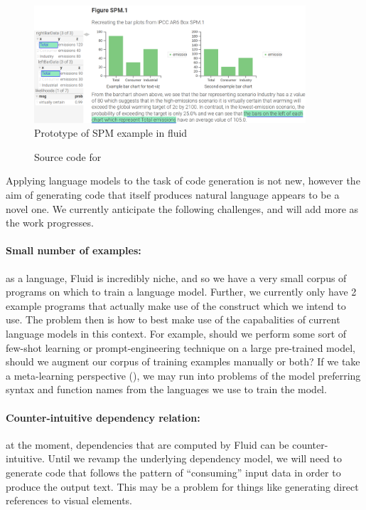 \begin{figure}
   \includegraphics[width=0.9\textwidth]{fig/figure-spm-fluid-mockup.png}
   \caption{Prototype of SPM example in fluid}
   \label{fig:figure-spm-fluid}
\end{figure}

\begin{figure}
   \tiny
   
   \caption{Source code for }
\end{figure}



Applying language models to the task of code generation is not new, however the aim of generating code that
itself produces natural language appears to be a novel one. We currently anticipate the following challenges,
and will add more as the work progresses.

\paragraph{Small number of examples:} as a language, Fluid is incredibly niche, and so we have a very small corpus
of programs on which to train a language model. Further, we currently only have 2 example programs that actually make
use of the  construct which we intend to use. The problem then is how to best make use of the capabalities
of current language models in this context. For example, should we perform some sort of few-shot learning or prompt-engineering
technique on a large pre-trained model, should we augment our corpus of training examples manually or both? If we take a meta-learning
perspective (), we may run into problems of the model preferring syntax and function names from the languages we use to
train the model.

\paragraph{Counter-intuitive dependency relation:} at the moment, dependencies that are computed by Fluid can be counter-intuitive.
Until we revamp the underlying dependency model, we will need to generate code that follows the pattern of ``consuming'' input
data in order to produce the output text. This may be a problem for things like generating direct references to visual elements.

